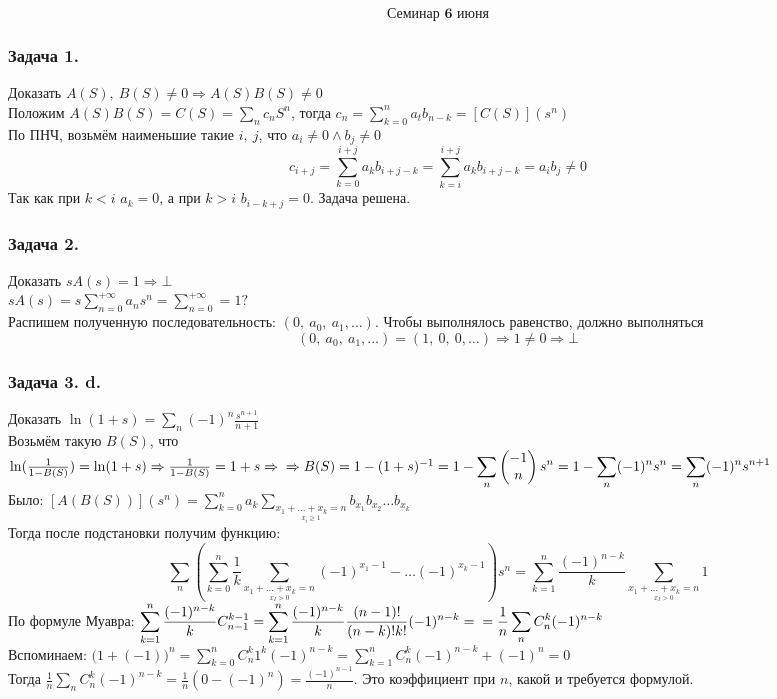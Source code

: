 \documentclass[12pt, letterpaper, twoside]{article}
\begin{document}
\[\textbf{Семинар 6 июня}\]
\subsubsection*{Задача 1.}
Доказать $A(S),\ B(S) \neq 0\Rightarrow A(S)B(S) \neq 0$\\
Положим $A(S)B(S) = C(S) = \displaystyle\sum_{n}c_nS^n$, тогда $c_n = \displaystyle\sum_{k = 0}^{n}a_t b_{n - k} = [C(S)](s^n)$\\
По ПНЧ, возьмём наименьшие такие $i,\ j$, что $a_i\neq 0\wedge b_j\neq 0$
\[c_{i + j} = \sum_{k = 0}^{i + j} a_k b_{i + j - k} = \sum_{k = i}^{i + j} a_k b_{i + j - k} = a_i b_j \neq 0\]
Так как при $k < i$ $a_k = 0$, а при $k > i$ $b_{i - k + j} = 0$. Задача решена.

\subsubsection*{Задача 2.}
Доказать $sA(s) = 1\Rightarrow \bot$\\
$sA(s) = s\displaystyle \sum_{n = 0}^{+\infty} a_n s^n = \sum_{n = 0}^{+\infty} = 1?$\\
Распишем полученную последовательность: $(0,\ a_0,\ a_1,\dots)$. Чтобы выполнялось равенство, должно выполняться
\[(0,\ a_0,\ a_1,\dots) = (1,\ 0,\ 0,\dots)\Rightarrow 1 \neq 0\Rightarrow \bot\]

\subsubsection*{Задача 3. d.}
Доказать $\ln(1 + s) = \displaystyle \sum_{n} (-1)^n \frac{s^{n + 1}}{n + 1}$\\
Возьмём такую $B(S)$, что $\ln (\frac{1}{1 - B(S)}) = \ln(1 + s)\Rightarrow \frac{1}{1 - B(S)} = 1 + s\Rightarrow\\
\Rightarrow B(S) = 1 - (1 + s)^{-1} = 1 - \displaystyle\sum_{n} \begin{pmatrix}
    -1\\
    n
\end{pmatrix} s^n = 1 - \sum_{n}(-1)^n s^n = \sum_{n} (-1)^n s^{n + 1}$\\
Было: $[A(B(S))](s^n) = \displaystyle \sum_{k = 0}^{n} a_k \sum_{\underset{x_i\geq 1}{x_1 + \dots + x_k = n}} b_{x_1} b_{x_2}\dots b_{x_k}$\\
Тогда после подстановки получим функцию:
\[ \sum_{n}\left( \sum_{k = 0}^{n} \frac{1}{k}\sum_{\underset{x_I > 0}{x_1 + \dots + x_k=n}}(-1)^{x_1 - 1}-\dots (-1)^{x_k - 1} \right)s^n = \sum_{k = 1}^{n}\frac{(-1)^{n - k}}{k}\sum_{\underset{x_I > 0}{x_1 + \dots + x_k=n}} 1 \]
По формуле Муавра: $\displaystyle \sum_{k = 1}^{n} \frac{(-1)^{n - k}}{k} C^{k - 1}_{n - 1} = \sum_{k = 1}^{n} \frac{(-1)^{n - k}}{k} \frac{(n - 1)!}{(n - k)!k!}(-1)^{n - k} =\\
= \frac{1}{n}\sum_{n} C_n^k (-1)^{n - k}$\\
Вспоминаем: $\big(1 + (-1)\big)^n =\displaystyle \sum_{k = 0}^{n} C_n^k 1^k (-1)^{n - k} = \sum_{k = 1}^{n}C_n^k (-1)^{n - k} + (-1)^n = 0$\\
Тогда $\frac{1}{n}\sum_{n} C_n^k (-1)^{n - k} = \frac{1}{n} (0 - (-1)^n) = \frac{(-1)^{n - 1}}{n}$. Это коэффициент при $n$, какой и требуется формулой.
\end{document}

